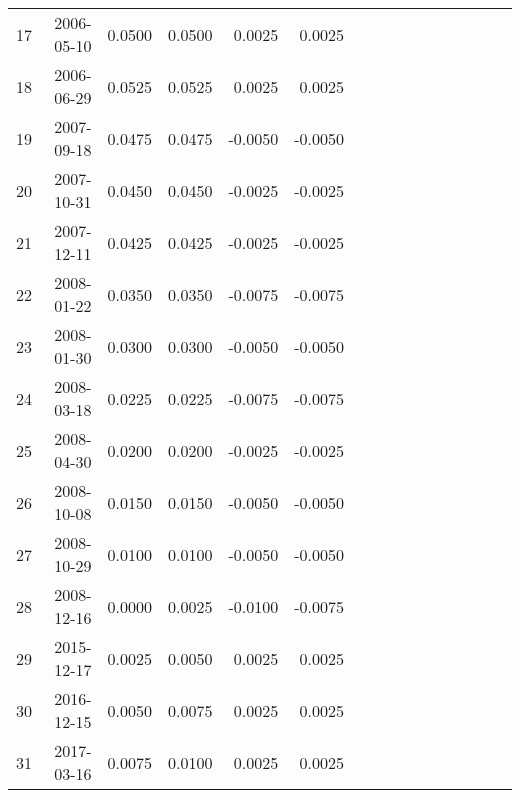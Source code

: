 \begin{sidewaystable}[htbp]
\begin{tabular}{rrrrrrrrrrrrrrrr}
		17 & 2006-05-10 & 0.0500 & 0.0500 & 0.0025 & 0.0025 &  &  &  &  &  &  &  &  &  &  \\ 
		18 & 2006-06-29 & 0.0525 & 0.0525 & 0.0025 & 0.0025 &  &  &  &  &  &  &  &  &  &  \\ 
		19 & 2007-09-18 & 0.0475 & 0.0475 & -0.0050 & -0.0050 &  &  &  &  &  &  &  &  &  &  \\ 
		20 & 2007-10-31 & 0.0450 & 0.0450 & -0.0025 & -0.0025 &  &  &  &  &  &  &  &  &  &  \\ 
		21 & 2007-12-11 & 0.0425 & 0.0425 & -0.0025 & -0.0025 &  &  &  &  &  &  &  &  &  &  \\ 
		22 & 2008-01-22 & 0.0350 & 0.0350 & -0.0075 & -0.0075 &  &  &  &  &  &  &  &  &  &  \\ 
		23 & 2008-01-30 & 0.0300 & 0.0300 & -0.0050 & -0.0050 &  &  &  &  &  &  &  &  &  &  \\ 
		24 & 2008-03-18 & 0.0225 & 0.0225 & -0.0075 & -0.0075 &  &  &  &  &  &  &  &  &  &  \\ 
		25 & 2008-04-30 & 0.0200 & 0.0200 & -0.0025 & -0.0025 &  &  &  &  &  &  &  &  &  &  \\ 
		26 & 2008-10-08 & 0.0150 & 0.0150 & -0.0050 & -0.0050 &  &  &  &  &  &  &  &  &  &  \\ 
		27 & 2008-10-29 & 0.0100 & 0.0100 & -0.0050 & -0.0050 &  &  &  &  &  &  &  &  &  &  \\ 
		28 & 2008-12-16 & 0.0000 & 0.0025 & -0.0100 & -0.0075 &  &  &  &  &  &  &  &  &  &  \\ 
		29 & 2015-12-17 & 0.0025 & 0.0050 & 0.0025 & 0.0025 &  &  &  &  &  &  &  &  &  &  \\ 
		30 & 2016-12-15 & 0.0050 & 0.0075 & 0.0025 & 0.0025 &  &  &  &  &  &  &  &  &  &  \\ 
		31 & 2017-03-16 & 0.0075 & 0.0100 & 0.0025 & 0.0025 &  &  &  &  &  &  &  &  &  &  \\ 
		\bottomrule
	\end{tabular}
\end{sidewaystable}